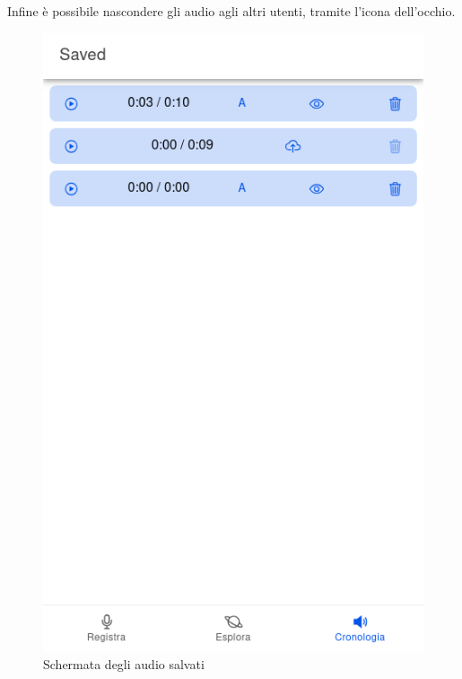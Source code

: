 \documentclass{article}
\begin{document}
Infine è possibile nascondere gli audio agli altri utenti, tramite l'icona dell'occhio.

\begin{figure}[H]
    \begin{minipage}{0.48\textwidth}
        \includegraphics[width=\linewidth]{saved.png}
        \centering
        \caption{Schermata degli audio salvati}
        \label{fig:saved}
    \end{minipage} \hfill
    \begin{minipage}{0.48\textwidth}

\end{minipage}
\end{figure}
\end{document}
